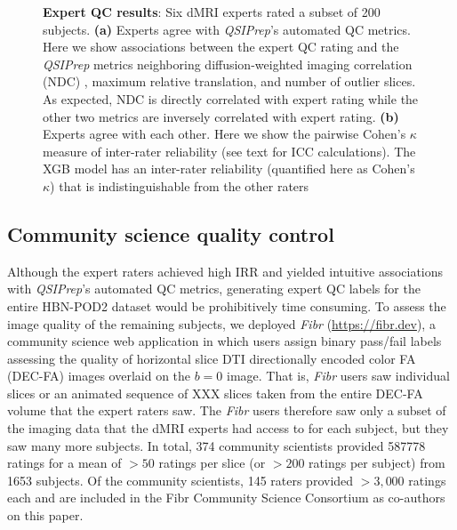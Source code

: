 \documentclass[fleqn,10pt]{wlscirep}
\begin{document}
\begin{figure}[ht]
\begin{subfigure}{.5\textwidth}
    \caption{}
    \label{fig:expert-qc:irr}
    \end{subfigure}
    \caption{%
        {\bf Expert QC results}:
        Six dMRI experts rated a subset of \num{200} subjects.
        \textbf{(a)} Experts agree with \emph{QSIPrep}'s automated QC metrics.
        Here we show associations between the expert QC rating and the
        \emph{QSIPrep} metrics neighboring diffusion-weighted imaging
        correlation (NDC) \cite{yeh2019-kb}, maximum relative translation, and
        number of outlier slices. As expected, NDC is directly correlated with expert rating while
        the other two metrics are inversely correlated with expert rating.
        \textbf{(b)} Experts agree with each other. Here we show the pairwise
        Cohen's $\kappa$ measure of inter-rater reliability (see text for ICC
        calculations). The XGB model has an inter-rater reliability (quantified
        here as Cohen's $\kappa$) that is indistinguishable from the other
        raters
    }
    \label{fig:expert-qc}
\end{figure}

\subsection*{Community science quality control}


Although the expert raters achieved high IRR and yielded intuitive associations
with \emph{QSIPrep}'s automated QC metrics, generating expert QC labels for the
entire HBN-POD2 dataset would be prohibitively time consuming. To assess the
image quality of the remaining subjects, we deployed \emph{Fibr}
(\url{https://fibr.dev}), a community science web application in which users
assign binary pass/fail labels assessing the quality of horizontal slice DTI
directionally encoded color FA (DEC-FA) images overlaid on the $b=0$ image. That
is, \emph{Fibr} users saw individual slices or an animated sequence of XXX
slices taken from the entire DEC-FA volume that the expert raters saw. The
\emph{Fibr} users therefore saw only a subset of the imaging data that the dMRI
experts had access to for each subject, but they saw many more subjects. In
total, \num{374} community scientists provided \num{587778} ratings for a mean
of $>50$ ratings per slice (or $>200$ ratings per subject) from \num{1653}
subjects. Of the community scientists, \num{145} raters provided $>3,000$
ratings each and are included in the Fibr Community Science Consortium as
co-authors on this paper.
\end{document}

